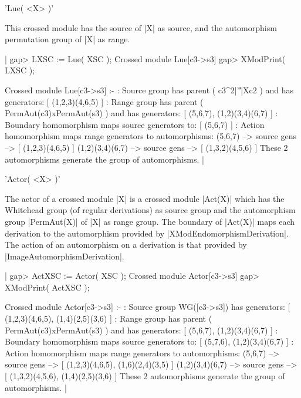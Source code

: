 %

'Lue( <X> )'

This  crossed   module has  the  source of   |X|  as  source, and  the
automorphism permutation group of |X| as range.

|    gap> LXSC := Lue( XSC );
    Crossed module Lue[c3->s3]
    gap> XModPrint( LXSC );

    Crossed module Lue[c3->s3] :- 
    : Source group has parent ( c3^2|'\|'|Xc2 ) and has generators:
      [ (1,2,3)(4,6,5) ]
    : Range group has parent ( PermAut(c3)xPermAut(s3) ) and has
        generators: [ (5,6,7), (1,2)(3,4)(6,7) ]
    : Boundary homomorphism maps source generators to:
      [ (5,6,7) ]
    : Action homomorphism maps range generators to automorphisms:
      (5,6,7) --> { source gens --> [ (1,2,3)(4,6,5) ] }
      (1,2)(3,4)(6,7) --> { source gens --> [ (1,3,2)(4,5,6) ] }
      These 2 automorphisms generate the group of automorphisms.  |

%

'Actor( <X> )'

The actor  of a crossed module |X|  is a crossed module |Act(X)| which
has the  Whitehead group (of regular derivations)  as source group and
the automorphism  group |PermAut(X)|   of |X|  as  range  group.   The
boundary of |Act(X)| maps each derivation to the automorphism provided
by |XModEndomorphismDerivation|.   The action of  an automorphism on a
derivation is that provided by |ImageAutomorphismDerivation|.

|    gap> ActXSC := Actor( XSC );
    Crossed module Actor[c3->s3]
    gap> XModPrint( ActXSC );

    Crossed module Actor[c3->s3] :- 
    : Source group WG([c3->s3]) has generators:
      [ (1,2,3)(4,6,5), (1,4)(2,5)(3,6) ]
    : Range group has parent ( PermAut(c3)xPermAut(s3) ) and has
        generators: [ (5,6,7), (1,2)(3,4)(6,7) ]
    : Boundary homomorphism maps source generators to:
      [ (5,7,6), (1,2)(3,4)(6,7) ]
    : Action homomorphism maps range generators to automorphisms:
      (5,6,7) --> { source gens --> [ (1,2,3)(4,6,5), (1,6)(2,4)(3,5) ] }
      (1,2)(3,4)(6,7) -->
                  { source gens --> [ (1,3,2)(4,5,6), (1,4)(2,5)(3,6) ] }
      These 2 automorphisms generate the group of automorphisms.  |

